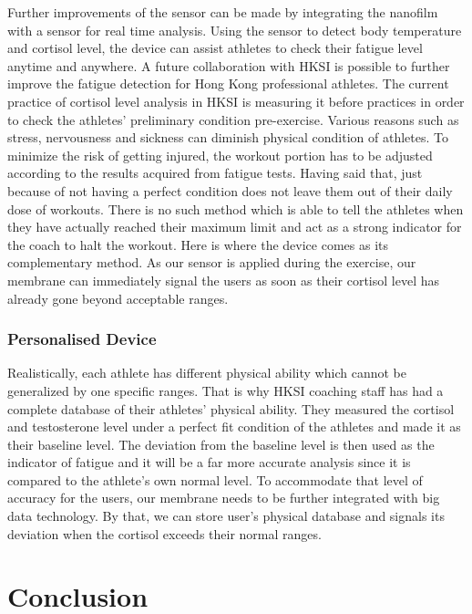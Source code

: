 \documentclass[journal]{IEEEtran}
\begin{document}
Further improvements of the sensor can be made by integrating the nanofilm with a sensor for real time analysis. Using the sensor to detect body temperature and cortisol level, the device can assist athletes to check their fatigue level anytime and anywhere. A future collaboration with HKSI is possible to further improve the fatigue detection for Hong Kong professional athletes. The current practice of cortisol level analysis in HKSI is measuring it before practices in order to check the athletes’ preliminary condition pre-exercise. Various reasons such as stress, nervousness and sickness can diminish physical condition of athletes. To minimize the risk of getting injured, the workout portion has to be adjusted according to the results acquired from fatigue tests. Having said that, just because of not having a perfect condition does not leave them out of their daily dose of workouts. There is no such method which is able to tell the athletes when they have actually reached their maximum limit and act as a strong indicator for the coach to halt the workout. Here is where the device comes as its complementary method. As our sensor is applied during the exercise, our membrane can immediately signal the users as soon as their cortisol level has already gone beyond acceptable ranges. 

\subsubsection{Personalised Device}

Realistically, each athlete has different physical ability which cannot be generalized by one specific ranges. That is why HKSI coaching staff has had a complete database of their athletes’ physical ability. They measured the cortisol and testosterone level under a perfect fit condition of the athletes and made it as their baseline level. The deviation from the baseline level is then used as the indicator of fatigue and it will be a far more accurate analysis since it is compared to the athlete’s own normal level. To accommodate that level of accuracy for the users, our membrane needs to be further integrated with big data technology. By that, we can store user’s physical database and signals its deviation when the cortisol exceeds their normal ranges.

\section{Conclusion}
\end{document}
